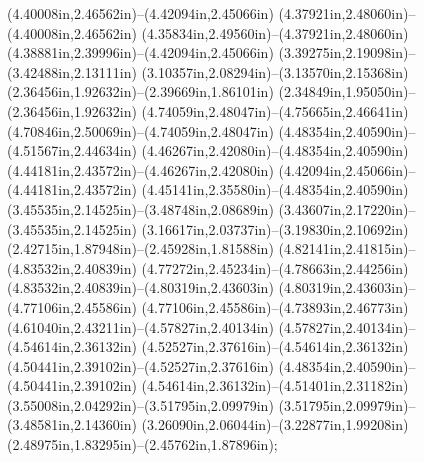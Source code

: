 (4.40008in,2.46562in)--(4.42094in,2.45066in) (4.37921in,2.48060in)--(4.40008in,2.46562in) (4.35834in,2.49560in)--(4.37921in,2.48060in) (4.38881in,2.39996in)--(4.42094in,2.45066in) (3.39275in,2.19098in)--(3.42488in,2.13111in) (3.10357in,2.08294in)--(3.13570in,2.15368in) (2.36456in,1.92632in)--(2.39669in,1.86101in) (2.34849in,1.95050in)--(2.36456in,1.92632in) (4.74059in,2.48047in)--(4.75665in,2.46641in) (4.70846in,2.50069in)--(4.74059in,2.48047in) (4.48354in,2.40590in)--(4.51567in,2.44634in) (4.46267in,2.42080in)--(4.48354in,2.40590in) (4.44181in,2.43572in)--(4.46267in,2.42080in) (4.42094in,2.45066in)--(4.44181in,2.43572in) (4.45141in,2.35580in)--(4.48354in,2.40590in) (3.45535in,2.14525in)--(3.48748in,2.08689in) (3.43607in,2.17220in)--(3.45535in,2.14525in) (3.16617in,2.03737in)--(3.19830in,2.10692in) (2.42715in,1.87948in)--(2.45928in,1.81588in) (4.82141in,2.41815in)--(4.83532in,2.40839in) (4.77272in,2.45234in)--(4.78663in,2.44256in) (4.83532in,2.40839in)--(4.80319in,2.43603in) (4.80319in,2.43603in)--(4.77106in,2.45586in) (4.77106in,2.45586in)--(4.73893in,2.46773in) (4.61040in,2.43211in)--(4.57827in,2.40134in) (4.57827in,2.40134in)--(4.54614in,2.36132in) (4.52527in,2.37616in)--(4.54614in,2.36132in) (4.50441in,2.39102in)--(4.52527in,2.37616in) (4.48354in,2.40590in)--(4.50441in,2.39102in) (4.54614in,2.36132in)--(4.51401in,2.31182in) (3.55008in,2.04292in)--(3.51795in,2.09979in) (3.51795in,2.09979in)--(3.48581in,2.14360in) (3.26090in,2.06044in)--(3.22877in,1.99208in) (2.48975in,1.83295in)--(2.45762in,1.87896in);

